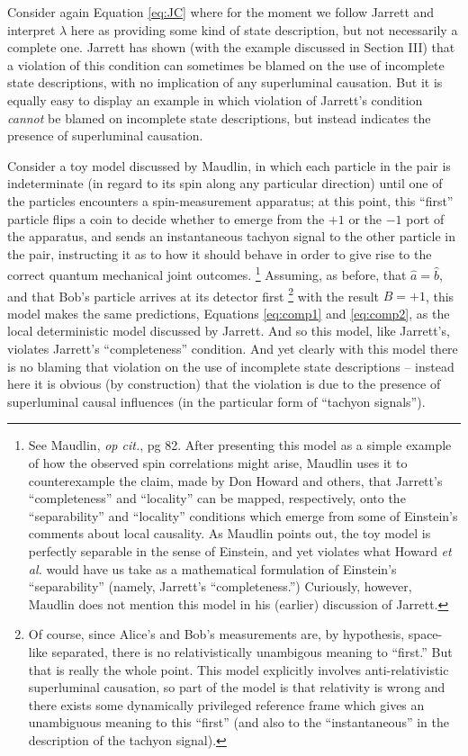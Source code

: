 \documentclass[12pt]{article}
\begin{document}
Consider again Equation \ref{eq:JC}
where for the moment we follow Jarrett and interpret $\lambda$ here as
providing some kind of state description, but not necessarily a
complete one.  Jarrett has shown (with the example discussed
in Section III) that a violation of this condition can sometimes be blamed
on the use of incomplete state descriptions, with no implication of
any superluminal causation.  But it is equally easy to display an
example in which violation of Jarrett's condition \emph{cannot} be 
blamed on incomplete state descriptions, but instead indicates the
presence of superluminal causation.

Consider a toy model discussed by Maudlin, in which each particle in the
pair is indeterminate (in regard to its spin along any particular
direction) until one of the particles encounters a spin-measurement
apparatus; at this point, this ``first'' particle flips a coin to
decide whether to emerge from the $+1$ or the $-1$ port of the
apparatus, and sends an instantaneous tachyon signal to the other
particle in the pair, instructing it as to how it should behave in
order to give rise to the correct quantum mechanical joint outcomes.
\footnote{See Maudlin, \emph{op cit.}, pg 82.  After presenting this model as
  a simple example of how the observed spin correlations might
  arise, Maudlin uses it to counterexample the claim, made by Don
  Howard and others, that Jarrett's ``completeness'' and ``locality''
  can be mapped, respectively, onto the ``separability'' and
  ``locality'' conditions which emerge from some of Einstein's
  comments about local causality.  As Maudlin points out, the toy
  model is perfectly separable in the sense of Einstein, and yet
  violates what Howard \emph{et al.} would have us take as a mathematical
  formulation of Einstein's ``separability'' (namely, Jarrett's
  ``completeness.'')  Curiously, however, Maudlin does not
  mention this model in his (earlier) discussion of Jarrett.}
Assuming, as before, that $\hat{a} = \hat{b}$, and that Bob's particle
arrives at its detector first
\footnote{Of course, since Alice's and Bob's measurements are, by
  hypothesis, space-like separated, there is no relativistically
  unambigous meaning to ``first.''  But that is really the whole
  point.  This model explicitly involves anti-relativistic
  superluminal causation, so part of the model is that relativity is
  wrong and there exists some dynamically privileged reference frame
  which gives an unambiguous meaning to this ``first'' (and also to
  the ``instantaneous'' in the description of the tachyon signal).}
with the result $B = +1$, 
this model makes the same predictions, Equations \ref{eq:comp1} and
\ref{eq:comp2}, as the local deterministic model discussed by
Jarrett.  And so this model, like Jarrett's, violates Jarrett's
``completeness'' condition.  And yet clearly with this model there is
no blaming that violation on the use of incomplete state descriptions
-- instead here it is obvious (by construction) that the violation is
due to the presence of superluminal causal influences (in the
particular form of ``tachyon signals'').    
\end{document}
